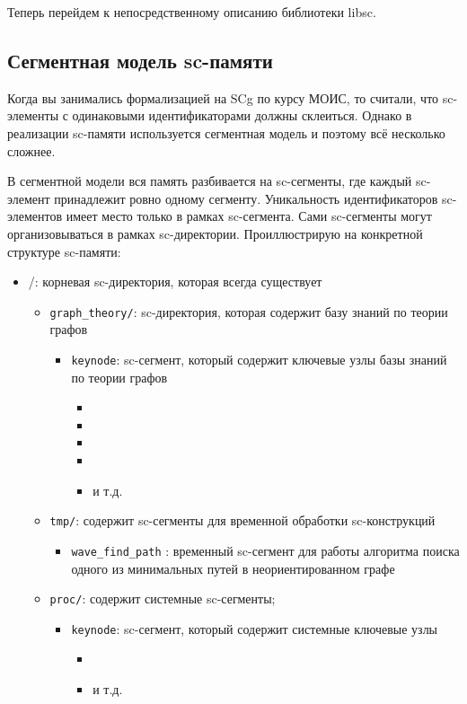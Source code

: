 Теперь перейдем к непосредственному описанию библиотеки libsc.

\subsection{Сегментная модель sc-памяти}

Когда вы занимались формализацией на SCg по курсу МОИС, то считали,
что sc-элементы с одинаковыми идентификаторами должны
склеиться. Однако в реализации sc-памяти используется сегментная
модель и поэтому всё несколько сложнее.

В сегментной модели вся память разбивается на sc-сегменты, где каждый
sc-элемент принадлежит ровно одному сегменту. Уникальность
идентификаторов sc-элементов имеет место только в рамках
sc-сегмента. Сами sc-сегменты могут организовываться в рамках
sc-директории. Проиллюстрирую на конкретной структуре sc-памяти:

\begin{itemize}
\item /: корневая sc-директория, которая всегда существует

  \begin{itemize}
  \item \verb|graph_theory/|: sc-директория, которая содержит базу знаний по
    теории графов
    \begin{itemize}
    \item \verb|keynode|: sc-сегмент, который содержит ключевые
      узлы базы знаний по теории графов
      \begin{itemize}
      \item {}
      \item {}
      \item {}
      \item {}
      \item {} и т.д.
      \end{itemize}
    \end{itemize}

  \item \verb|tmp/|: содержит sc-сегменты для временной обработки
    sc-конструкций
    \begin{itemize}
    \item \verb|wave_find_path| : временный sc-сегмент для работы алгоритма
      поиска одного из минимальных путей в неориентированном графе
    \end{itemize}

  \item \verb|proc/|: содержит системные sc-сегменты;
    \begin{itemize}
    \item \verb|keynode|: sc-сегмент, который содержит системные ключевые
      узлы
      \begin{itemize}
      \item {}
      \item {} и т.д.
      \end{itemize}
    \end{itemize}
  \end{itemize}
\end{itemize}

